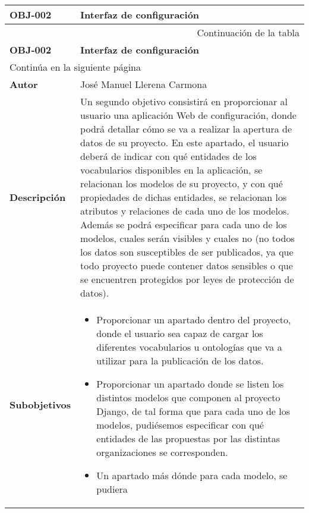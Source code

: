 \begin{center}
\begin{longtable}{||p{3.4cm}|p{12cm}||}
 \hline \hline \bf OBJ-002 &  \bf Interfaz de configuración \\
\hline
\endfirsthead
\hline \multicolumn{2}{|r|}{{Continuación de la tabla}} \\ \hline
 \hline \bf OBJ-002 &  \bf Interfaz de configuración \\
\hline
\endhead
\hline \multicolumn{2}{|l|}{{Continúa en la siguiente página}} \\ \hline
\endfoot
\endlastfoot
 \hline \bf Autor & José Manuel Llerena Carmona \\
 \hline \bf Descripción & Un segundo objetivo consistirá en proporcionar al
             usuario una aplicación Web de configuración, donde podrá detallar
             cómo se va a realizar la apertura de datos de su proyecto. En este
             apartado, el usuario deberá de indicar con qué entidades de los
             vocabularios disponibles en la aplicación, se relacionan los
             modelos de su proyecto, y con qué propiedades de dichas entidades,
             se relacionan los atributos y relaciones de cada uno de los modelos.
             Además se podrá especificar para cada uno de los modelos, cuales
             serán visibles y cuales no (no todos los datos son susceptibles de
             ser publicados, ya que todo proyecto puede contener datos sensibles
             o que se encuentren protegidos por leyes de protección de datos).\\
 \hline \bf Subobjetivos &
             \begin{itemize}
                 \item Proporcionar un apartado dentro del proyecto, donde el
                        usuario sea capaz de cargar los diferentes vocabularios
                        u ontologías que va a utilizar para la publicación de
                        los datos.
                 \item Proporcionar un apartado donde se listen los distintos
                        modelos que componen al proyecto Django, de tal forma
                        que para cada uno de los modelos, pudiésemos especificar
                        con qué entidades de las propuestas por las distintas
                        organizaciones se corresponden.
                 \item Un apartado más dónde para cada modelo, se pudiera

\end{itemize}
\end{longtable}
\end{center}
